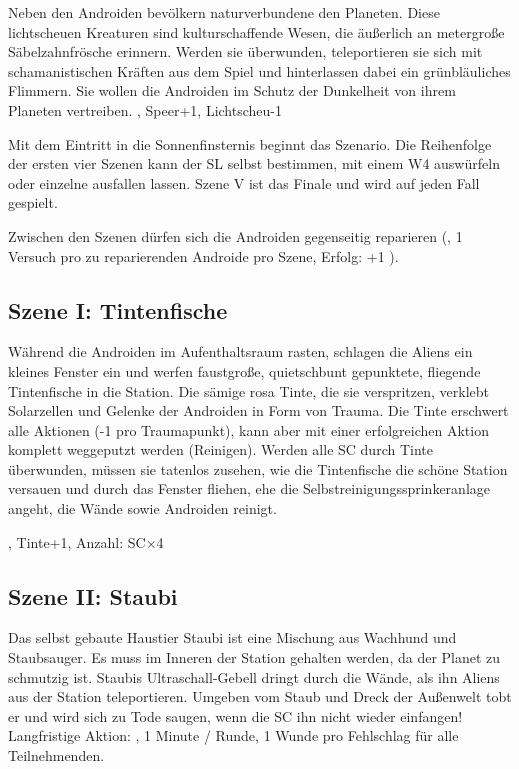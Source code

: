 {		Neben den Androiden bevölkern naturverbundene  den Planeten. Diese lichtscheuen Kreaturen sind kulturschaffende Wesen, die äußerlich an metergroße Säbelzahnfrösche erinnern. Werden sie überwunden, teleportieren sie sich mit schamanistischen Kräften aus dem Spiel und hinterlassen dabei ein grünbläuliches Flimmern. Sie wollen die Androiden im Schutz der Dunkelheit von ihrem Planeten vertreiben. , Speer+1, Lichtscheu-1


		\noindent
		Mit dem Eintritt in die Sonnenfinsternis beginnt das Szenario. Die Reihenfolge der ersten vier Szenen kann der SL selbst bestimmen, mit einem W4 auswürfeln oder einzelne ausfallen lassen. Szene V ist das Finale und wird auf jeden Fall gespielt.

		Zwischen den Szenen dürfen sich die Androiden gegenseitig reparieren (, 1 Versuch pro zu reparierenden Androide pro Szene, Erfolg: +1 \HD).

		\subsection{Szene I: Tintenfische}

		\noindent
		Während die Androiden im Aufenthaltsraum rasten, schlagen die Aliens ein kleines Fenster ein und werfen  faustgroße, quietschbunt gepunktete, fliegende Tintenfische in die Station. Die sämige rosa Tinte, die sie verspritzen, verklebt Solarzellen und Gelenke der Androiden in Form von Trauma. Die Tinte erschwert alle Aktionen (-1 pro Traumapunkt), kann aber mit einer erfolgreichen Aktion komplett weggeputzt werden (Reinigen). Werden alle SC durch Tinte überwunden, müssen sie tatenlos zusehen, wie die Tintenfische die schöne Station versauen und durch das Fenster fliehen, ehe die Selbstreinigungssprinkeranlage angeht, die Wände sowie Androiden reinigt.

		, Tinte+1, Anzahl: SC×4

		\subsection{Szene II: Staubi}

		\noindent
		Das selbst gebaute Haustier Staubi ist eine Mischung aus Wachhund und Staubsauger. Es muss im Inneren der Station gehalten werden, da der Planet zu schmutzig ist. Staubis Ultraschall-Gebell dringt durch die Wände, als ihn Aliens aus der Station teleportieren. Umgeben vom Staub und Dreck der Außenwelt tobt er und wird sich zu Tode saugen, wenn die SC ihn nicht wieder einfangen! Langfristige Aktion: , 1 Minute / Runde, 1 Wunde pro Fehlschlag für alle Teilnehmenden.

}
